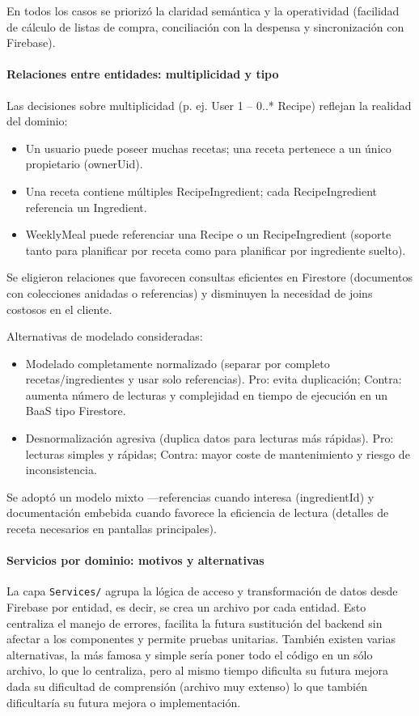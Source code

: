 \documentclass[twoside, openright, 11pt]{report}
\begin{document}
		
		En todos los casos se priorizó la claridad semántica y la operatividad (facilidad de cálculo de listas de compra, conciliación con la despensa y sincronización con Firebase).
		
		\paragraph{Relaciones entre entidades: multiplicidad y tipo}
		Las decisiones sobre multiplicidad (p. ej. User 1 -- 0..* Recipe) reflejan la realidad del dominio:
		\begin{itemize}
			\item Un usuario puede poseer muchas recetas; una receta pertenece a un único propietario (ownerUid).
			\item Una receta contiene múltiples RecipeIngredient; cada RecipeIngredient referencia un Ingredient.
			\item WeeklyMeal puede referenciar una Recipe o un RecipeIngredient (soporte tanto para planificar por receta como para planificar por ingrediente suelto).
		\end{itemize}
		Se eligieron relaciones que favorecen consultas eficientes en Firestore (documentos con colecciones anidadas o referencias) y disminuyen la necesidad de joins costosos en el cliente.
		
		Alternativas de modelado consideradas:
		\begin{itemize}
			\item Modelado completamente normalizado (separar por completo recetas/ingredientes y usar solo referencias). Pro: evita duplicación; Contra: aumenta número de lecturas y complejidad en tiempo de ejecución en un BaaS tipo Firestore.
			\item Desnormalización agresiva (duplica datos para lecturas más rápidas). Pro: lecturas simples y rápidas; Contra: mayor coste de mantenimiento y riesgo de inconsistencia.
		\end{itemize}
		Se adoptó un modelo mixto —referencias cuando interesa (ingredientId) y documentación embebida cuando favorece la eficiencia de lectura (detalles de receta necesarios en pantallas principales).
		
		\paragraph{Servicios por dominio: motivos y alternativas}
		La capa \texttt{Services/} agrupa la lógica de acceso y transformación de datos desde Firebase por entidad, es decir, se crea un archivo por cada entidad.
		Esto centraliza el manejo de errores, facilita la futura sustitución del backend sin afectar a los componentes y permite pruebas unitarias. También existen varias alternativas, la más famosa y simple sería poner todo el código en un sólo archivo, lo que lo centraliza, pero al mismo tiempo dificulta su futura mejora dada su dificultad de comprensión (archivo muy extenso) lo que también dificultaría su futura mejora o implementación.
		
\end{document}
